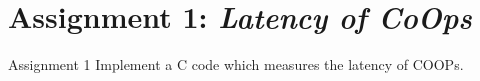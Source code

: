 
\section{Assignment 1: \newline \textit{Latency of CoOps}}
\begin{frame}[fragile]{Assignment 1}
    Implement a C code which measures the latency of COOPs.
\end{frame}


